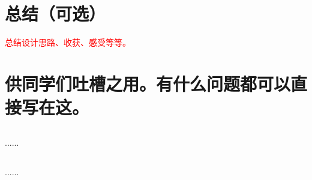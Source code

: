 \section{总结（可选）}
\textcolor{red}{总结设计思路、收获、感受等等。}

\section{供同学们吐槽之用。有什么问题都可以直接写在这。}
\subsection{\stunamea}
......
\subsection{\stunameb}
......